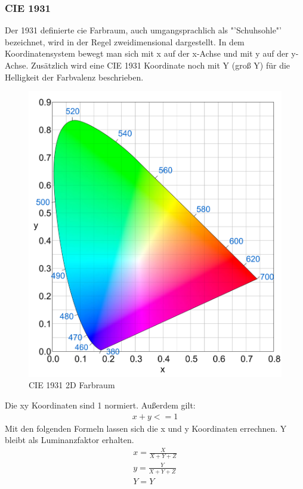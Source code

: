 \documentclass[11pt]{scrartcl}
\begin{document}
\subsubsection{CIE 1931}
Der 1931 definierte \ac{cie} Farbraum, auch umgangsprachlich als "'Schuhsohle"' bezeichnet, wird in der Regel zweidimensional dargestellt. In dem Koordinatensystem
bewegt man sich mit x auf der x-Achse und mit y auf der y-Achse. Zusätzlich wird eine CIE 1931 Koordinate noch mit Y (groß Y) für die Helligkeit der Farbvalenz
beschrieben.
\begin{figure}[H]
    \begin{center}
        \includegraphics[width=.7\textwidth]{images/cie_1931.png}
    \end{center}
    \caption{CIE 1931 2D Farbraum \cite{wikipedia1931Image}}
\end{figure}
\noindent
Die xy Koordinaten sind 1 normiert. Außerdem gilt:
\begin{align}
    x + y <= 1
\end{align}
Mit den folgenden Formeln lassen sich die x und y Koordinaten errechnen. Y bleibt als Luminanzfaktor erhalten.
\begin{align}\label{Equ:7}
    x = \frac{X}{X+Y+Z}\\
    y = \frac{Y}{X+Y+Z}\\
    Y = Y \label{Equ:8}
\end{align}
\cite{lindbloom}
\end{document}

